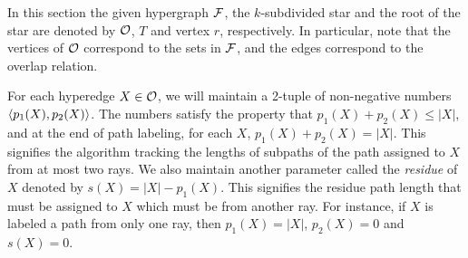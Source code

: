 In this section the given hypergraph ${\cal F}$, the $k$-subdivided star
and the root of the star are denoted by ${\cal O}$, $T$ and vertex $r$,
respectively.  In particular, note that the vertices of ${\cal O}$
correspond to the sets in ${\cal F}$, and the edges correspond to the
overlap relation.

\noindent
For each hyperedge $X \in {\cal O}$, we will maintain a 2-tuple of non-negative
 numbers $\left\langle p_1(X), p_2(X) \right\rangle$.  The numbers satisfy the property that
 $p_1(X) + p_2(X) \leq |X|$, and at the end of path labeling, for each
 $X$, $p_1(X) + p_2(X) = |X|$.  This signifies the algorithm tracking
 the lengths of subpaths of the path assigned to $X$ from at most two
 rays. We also maintain another parameter called the {\em residue} of
 $X$ denoted by $s(X)=|X| - p_1(X)$. This signifies the residue path
 length that must be assigned to $X$ which must be from another
 ray. For instance, if $X$ is labeled a path from only one ray, then
 $p_1(X) = |X|$, $p_2(X) = 0$ and $s(X) = 0$.

